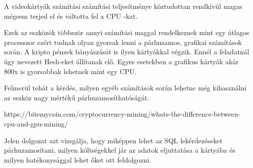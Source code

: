 
A videokártyák számítási számítási teljesítménye köztudottan rendkívül magas mégsem terjed el és váltotta fel a CPU -kat.

Ezek az eszközök többször annyi számítási maggal rendelkeznek mint egy átlagos processzor ezért tudnak olyan gyorsak lenni a párhuzamos, grafikai számítások során. A kripto pénzek bányászását is ilyen kártyákkal végzik. Ennél a feladatnál úgy nevezett Hesh-eket állítanak elő. Egyes esetekben a grafikus kártyák akár 800x is gyorsabbak lehetnek mint egy CPU.

Felmerül tehát a kérdés, milyen egyéb számítások során lehetne még kihasználni az eszköz nagy mértékű párhuzamosíthatóságát.

https://bitemycoin.com/cryptocurrency-mining/whats-the-difference-between-cpu-and-gpu-mining/

Jelen dolgozat azt vizsgálja, hogy miképpen lehet az SQL lekérdezéseket párhuzamosítani, milyen költségekkel jár az adatok eljuttatása a kártyába és milyen hatékonysággal lehet őket ott feldolgozni. 